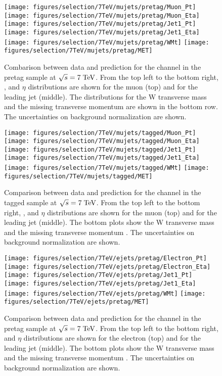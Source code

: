 \begin{figure}
  \centering
  \texttt{[image: figures/selection/7TeV/mujets/pretag/Muon\_Pt]}
  \texttt{[image: figures/selection/7TeV/mujets/pretag/Muon\_Eta]}
  \texttt{[image: figures/selection/7TeV/mujets/pretag/Jet1\_Pt]}
  \texttt{[image: figures/selection/7TeV/mujets/pretag/Jet1\_Eta]}
  \texttt{[image: figures/selection/7TeV/mujets/pretag/WMt]}
  \texttt{[image: figures/selection/7TeV/mujets/pretag/MET]}
  \caption{Combarison between data and prediction for the \mujets{} channel in the pretag
    sample at $\sqrt{s} = 7 \; \mathrm{TeV}{}$. From the top left to the bottom
    right, \pt{}, and $\eta{}$ distributions are shown for the
    muon (top) and for the leading jet (middle).  The distributions
    for the W transverse mass \mtw{} and the missing transverse
    momentum \met{} are shown in the bottom row. 
    The uncertainties on background normalization are shown.}
  \label{fig:2011mu_pretag}
\end{figure}
%
\begin{figure}
\centering
\texttt{[image: figures/selection/7TeV/mujets/tagged/Muon\_Pt]}
\texttt{[image: figures/selection/7TeV/mujets/tagged/Muon\_Eta]}
\texttt{[image: figures/selection/7TeV/mujets/tagged/Jet1\_Pt]}
\texttt{[image: figures/selection/7TeV/mujets/tagged/Jet1\_Eta]}
\texttt{[image: figures/selection/7TeV/mujets/tagged/WMt]}
\texttt{[image: figures/selection/7TeV/mujets/tagged/MET]}
\caption{Comparison between data and prediction for the \mujets{} channel in the tagged
  sample at $\sqrt{s} = 7 \; \mathrm{TeV}{}$.  From the top left to the bottom
  right, \pt{}, and $\eta$ distributions are shown for the
  muon (top) and for the leading jet (middle). The bottom plots show
  the W transverse mass \mtw{} and the missing transverse
  momentum \met{}. The uncertainties on background normalization are
  shown.}
\label{fig:2011mu_tagged}
\end{figure}
%
\begin{figure}
  \centering
  \texttt{[image: figures/selection/7TeV/ejets/pretag/Electron\_Pt]}
  \texttt{[image: figures/selection/7TeV/ejets/pretag/Electron\_Eta]}
  \texttt{[image: figures/selection/7TeV/ejets/pretag/Jet1\_Pt]}
  \texttt{[image: figures/selection/7TeV/ejets/pretag/Jet1\_Eta]}
  \texttt{[image: figures/selection/7TeV/ejets/pretag/WMt]}
  \texttt{[image: figures/selection/7TeV/ejets/pretag/MET]}
  \caption{Comparison between data and prediction for the \ejets{} channel in the pretag
    sample at $\sqrt{s} = 7 \; \mathrm{TeV}{}$.  From the top left to the bottom
    right, \pt{} and $\eta$ distributions are shown for the
    electron (top) and for the leading jet (middle). The bottom plots
    show the W transverse mass \mtw{} and the missing transverse
    momentum \met{}. The uncertainties on background normalization are
    shown.} 
  \label{fig:2011ele_pretag}
\end{figure}
